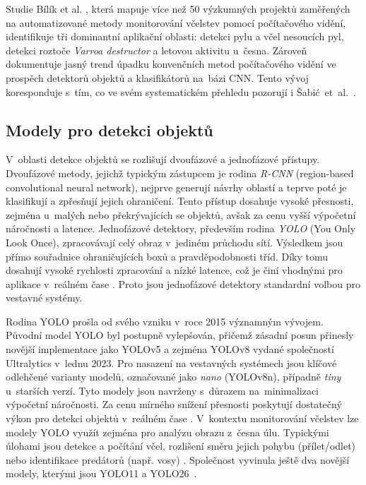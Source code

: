 Studie Bílík et al. \cite{Bilik2024}, která mapuje více než 50 výzkumných projektů zaměřených na automatizované metody monitorování včelstev pomocí počítačového vidění, identifikuje tři dominantní aplikační oblasti: detekci pylu a včel nesoucích pyl, detekci roztoče \textit{Varroa destructor} a letovou aktivitu u~česna. Zároveň dokumentuje jasný trend úpadku konvenčních metod počítačového vidění ve prospěch detektorů objektů a klasifikátorů na~bázi CNN. Tento vývoj koresponduje s~tím, co ve svém systematickém přehledu pozorují i Šabić~et~al.~\cite{Sabic2025}.

\subsection*{Modely pro detekci objektů} \label{sec:modely_detekce}
V~oblasti detekce objektů se rozlišují dvoufázové a jednofázové přístupy. Dvoufázové metody, jejichž typickým zástupcem je rodina \textit{R-CNN} (region-based convolutional neural network), nejprve generují návrhy oblastí a teprve poté je klasifikují a zpřesňují jejich ohraničení. Tento přístup dosahuje vysoké přesnosti, zejména u~malých nebo překrývajících se objektů, avšak za cenu vyšší výpočetní náročnosti a latence. Jednofázové detektory, především rodina \textit{YOLO} (You Only Look Once), zpracovávají celý obraz v~jediném průchodu sítí. Výsledkem jsou přímo souřadnice ohraničujících boxů a pravděpodobnosti tříd. Díky tomu dosahují vysoké rychlosti zpracování a nízké latence, což je činí vhodnými pro aplikace v~reálném čase \cite{ML-IBM}. Proto jsou jednofázové detektory standardní volbou pro vestavné systémy.

Rodina YOLO prošla od svého vzniku v~roce 2015 významným vývojem. Původní model YOLO byl postupně vylepšován, přičemž zásadní posun přinesly novější implementace jako YOLOv5 a zejména YOLOv8 vydané společností Ultralytics v~lednu 2023. Pro nasazení na vestavných systémech jsou klíčové odlehčené varianty modelů, označované jako \textit{nano} (YOLOv8n), případně \textit{tiny} u~starších verzí. Tyto modely jsou navrženy s~důrazem na~minimalizaci výpočetní náročnosti. Za cenu mírného snížení přesnosti poskytují dostatečný výkon pro detekci objektů v~reálném čase \cite{Krishnan2024}. V~kontextu monitorování včelstev lze modely YOLO využít zejména pro analýzu obrazu z~česna úlu. Typickými úlohami jsou detekce a počítání včel, rozlišení směru jejich pohybu (přílet/odlet) nebo identifikace predátorů (např. vosy) \cite{Bilik2024}. Společnost vyvinula ještě dva novější modely, kterými jsou YOLO11 a YOLO26~\cite{ultralytics}.


